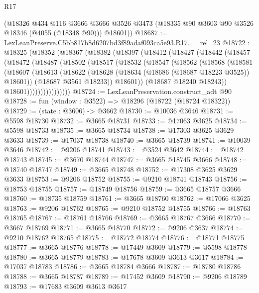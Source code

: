 \begin{lexlean}{R17}
\begin{coremodule}
      (@18326
        @434
        @116
        @3666
        @3666
        @3526
        @3473
        (@18335 @90 @3603 @90 @3526 @18346 (@4055 (@18348 @90)))
        @18601))
@18687 := LexLeanPreserve.C5bb817b8d6207bd3f89adaf093ca5e93.R17.__rel_23
@18722 := @18325
    (@18352
      (@18367
        (@18382
          (@18397
            (@18412
              (@18427
                (@18442
                  (@18457
                    (@18472
                      (@18487
                        (@18502
                          (@18517
                            (@18532
                              (@18547
                                (@18562
                                  (@18568
                                    (@18581
                                      (@18607
                                        (@18613
                                          (@18622
                                            (@18628 (@18634 (@18686 (@18687 @18223 @3525)) @18601))
                                            (@18687 @3561 @18233))
                                          @18601))
                                      (@18687 @18240 @18243))
                                    @18601))))))))))))))))
@18724 := LexLeanPreservation.construct_adt @90
@18728 := fun (window : @3522) => @18296 (@18722 (@18724 @18322))
@18729 := (state : @3606) -> @3662
@18730 := @10036 @3646
@18731 := @5598 @18730
@18732 := @3665 @18731
@18733 := @17063 @3625
@18734 := @5598 @18733
@18735 := @3665 @18734
@18738 := @17303 @3625 @3629 @3633
@18739 := @17037 @18738
@18740 := @3665 @18739
@18741 := @10039 @3646
@18742 := @9206 @18741
@18743 := @3524 @3642
@18744 := @18742 @18743
@18745 := @3670 @18744
@18747 := @3665 @18745 @3666
@18748 := @18740 @18747
@18749 := @3665 @18748
@18752 := @17308 @3625 @3629 @3633
@18753 := @9206 @18752
@18755 := @9210 @18741 @18743
@18756 := @18753 @18755
@18757 := @18749 @18756
@18759 := @3665 @18757 @3666
@18760 := @18735 @18759
@18761 := @3665 @18760
@18762 := @17066 @3625
@18763 := @9206 @18762
@18765 := @9210 @18752 @18755
@18766 := @18763 @18765
@18767 := @18761 @18766
@18769 := @3665 @18767 @3666
@18770 := @3667 @18769
@18771 := @3665 @18770
@18772 := @9206 @3637
@18774 := @9210 @18762 @18765
@18775 := @18772 @18774
@18776 := @18771 @18775
@18777 := @3665 @18776
@18778 := @17449 @3609
@18779 := @5598 @18778
@18780 := @3665 @18779
@18783 := @17678 @3609 @3613 @3617
@18784 := @17037 @18783
@18786 := @3665 @18784 @3666
@18787 := @18780 @18786
@18788 := @3665 @18787
@18789 := @17452 @3609
@18790 := @9206 @18789
@18793 := @17683 @3609 @3613 @3617

\end{coremodule}
\end{lexlean}
